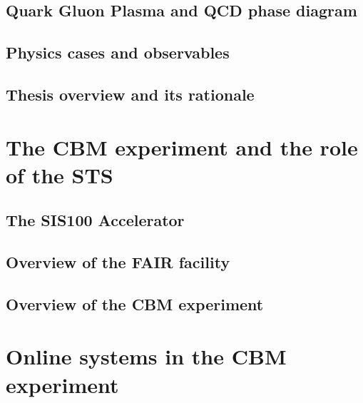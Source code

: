 \section{Quark Gluon Plasma and QCD phase diagram}
\section{Physics cases and observables}
\section{Thesis overview and its rationale}
\chapter{The CBM experiment and the role of the STS}
\section{The SIS100 Accelerator}
\section{Overview of the FAIR facility}
\section{Overview of the CBM experiment}

\chapter{Online systems in the CBM experiment}






